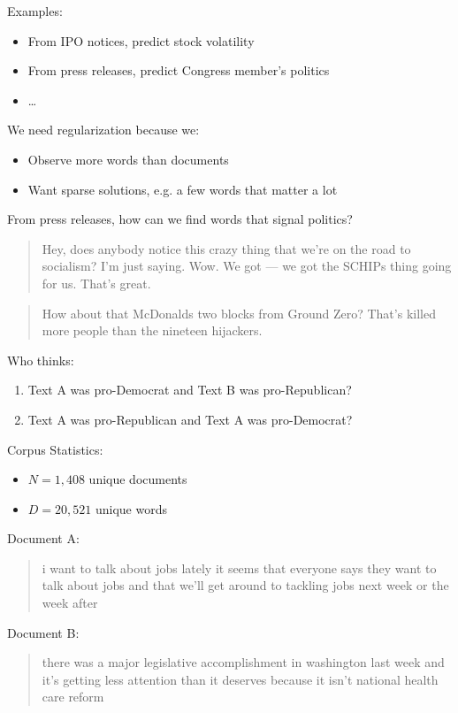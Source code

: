 \documentclass[xcolor=pdftex,dvipsnames,table]{beamer}
\begin{document}
\frame
{
	Examples:
	\begin{itemize}
		\item{From IPO notices, predict stock volatility}
		\item{From press releases, predict Congress member's politics}
		\item{\ldots}
	\end{itemize}
}

\frame
{
	We need regularization because we:
	\begin{itemize}
		\item{Observe more words than documents}
		\item{Want sparse solutions, e.g. a few words that matter a lot}
	\end{itemize}
}

\frame
{
	From press releases, how can we find words that signal politics?
}

\frame
{
	\begin{quote}
		Hey, does anybody notice this crazy thing that we're on the road to socialism? I'm just saying. Wow. We got --- we got the SCHIPs thing going for us. That's great.
	\end{quote}
}

\frame
{
	\begin{quote}
		How about that McDonalds two blocks from Ground Zero? That's killed more people than the nineteen hijackers.
	\end{quote}
}

\frame
{
	Who thinks:
	\begin{enumerate}
		\item{Text A was pro-Democrat and Text B was pro-Republican?}
		\item{Text A was pro-Republican and Text A was pro-Democrat?}
	\end{enumerate}
}

\frame
{
	Corpus Statistics:
	\begin{itemize}
		\item{$N = 1,408$ unique documents}
		\item{$D = 20,521$ unique words}
	\end{itemize}
}

\frame
{
	Document A:
	\begin{quote}
	i want to talk about jobs lately it seems that everyone says they want to talk about jobs and that we'll get around to tackling jobs next week or the week after
	\end{quote}
}

\frame
{
	Document B:
	\begin{quote}
	there was a major legislative accomplishment in washington last week and it's getting less attention than it deserves because it isn't national health care reform
	\end{quote}
}
\end{document}
